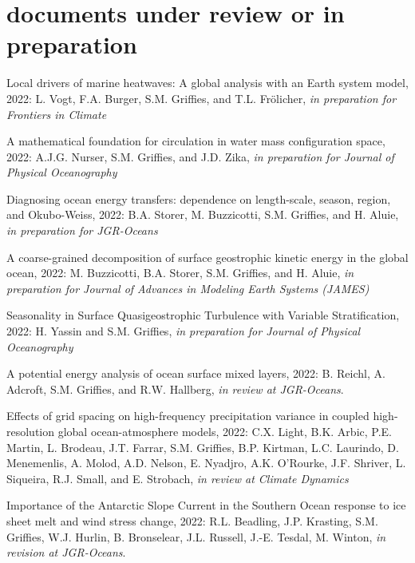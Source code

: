 \section*{\sc \color{Maroon} documents under review or in preparation}

\small 


\begin{etaremune}

\item Local drivers of marine heatwaves: A global analysis with an Earth system model, 2022: L. Vogt, F.A. Burger, S.M. Grif\/f\/ies, and T.L. {Fr\"{o}licher}, {\it in preparation for Frontiers in Climate} 

\item A mathematical foundation for circulation in water mass configuration space, 2022: A.J.G. Nurser, S.M. Grif\/f\/ies, and J.D. Zika, {\it in preparation for Journal of Physical Oceanography}

\item Diagnosing ocean energy transfers: dependence on length-scale, season, region, and Okubo-Weiss, 2022: B.A. Storer, M. Buzzicotti, S.M. Grif\/f\/ies, and H. Aluie, {\it in preparation for JGR-Oceans}

\item A coarse-grained decomposition of surface geostrophic kinetic energy in the global ocean, 2022: M. Buzzicotti, B.A. Storer, S.M. Grif\/f\/ies, and H. Aluie,  {\it in preparation for Journal of Advances in Modeling Earth Systems (JAMES)}

\item Seasonality in Surface Quasigeostrophic Turbulence with Variable Stratification, 2022: H. Yassin and S.M. Grif\/f\/ies,  {\it in preparation for Journal of Physical Oceanography}

\item A potential energy analysis of ocean surface mixed layers, 2022: B. Reichl, A. Adcroft, S.M. Grif\/f\/ies, and R.W. Hallberg, {\it in review at  JGR-Oceans}. 

\item Effects of grid spacing on high-frequency precipitation variance in coupled high-resolution global ocean-atmosphere models, 2022: C.X. Light, B.K. Arbic, P.E. Martin, L. Brodeau, J.T. Farrar, S.M. Griffies, B.P. Kirtman, L.C. Laurindo,  D. Menemenlis, A. Molod, A.D. Nelson, E. Nyadjro, A.K. O'Rourke,  J.F. Shriver, L. Siqueira, R.J. Small, and E. Strobach, {\it in review at Climate Dynamics}

\item Importance of the Antarctic Slope Current in the Southern Ocean response to ice sheet melt and wind stress change, 2022: R.L. Beadling, J.P. Krasting, S.M. Grif\/f\/ies, W.J. Hurlin, B. Bronselear, J.L. Russell, J.-E. Tesdal, M. Winton, {\it in revision at JGR-Oceans}. 



\end{etaremune}



